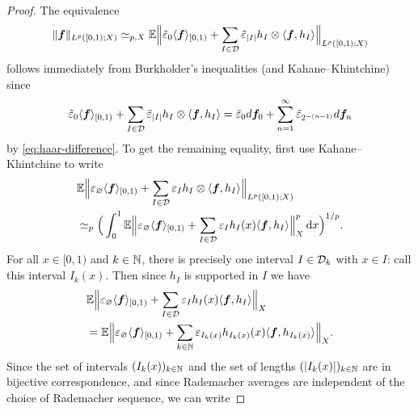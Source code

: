 \begin{proof}
  The equivalence
    \begin{equation*}
    \|\bm{f}\|_{L^p([0,1);X)}
    \simeq_{p,X} \mathbb{E} \Big\|  \tilde{\varepsilon}_{0} \langle \bm{f} \rangle_{[0,1)} + \sum_{I \in \mathcal{D}} \tilde{\varepsilon}_{|I|} h_{I} \otimes \langle \bm{f}, h_{I} \rangle \Big\|_{L^p([0,1);X)}
  \end{equation*}
  follows immediately from Burkholder's inequalities (and Kahane--Khintchine) since
  \begin{equation*}
     \tilde{\varepsilon}_{0} \langle \bm{f} \rangle_{[0,1)} + \sum_{I \in \mathcal{D}} \tilde{\varepsilon}_{|I|} h_{I} \otimes \langle \bm{f}, h_{I} \rangle
    = \tilde{\varepsilon}_{0} d\bm{f}_{0} + \sum_{n = 1}^{\infty} \tilde{\varepsilon}_{2^{-(n-1)}} d\bm{f}_{n}
  \end{equation*}
  by \eqref{eq:haar-difference}.
  To get the remaining equality, first use Kahane--Khintchine to write
  \begin{equation}\label{eq:haar-sqfn-kk}
    \begin{aligned}
      &\mathbb{E} \Big\| \varepsilon_{\varnothing} \langle \bm{f} \rangle_{[0,1)} + \sum_{I \in \mathcal{D}} \varepsilon_{I} h_{I} \otimes \langle \bm{f}, h_{I} \rangle \Big\|_{L^p([0,1);X)} \\
      &\simeq_{p} \Big( \int_{0}^{1} \mathbb{E} \Big\| \varepsilon_{\varnothing} \langle \bm{f} \rangle_{[0,1)} + \sum_{I \in \mathcal{D}} \varepsilon_{I} h_{I}(x) \langle \bm{f}, h_{I} \rangle \Big\|_{X}^{p} \, \mathrm{d} x\Big)^{1/p}.
  \end{aligned}
  \end{equation}
  For all $x \in [0,1)$ and $k \in \mathbb{N}$, there is precisely one interval $I \in \mathcal{D}_{k}$ with $x \in I$: call this interval $I_{k}(x)$.
  Then since $h_{I}$ is supported in $I$ we have
  \begin{equation*}
    \begin{aligned}
    &\mathbb{E} \Big\|  \varepsilon_{\varnothing} \langle \bm{f} \rangle_{[0,1)} + \sum_{I \in \mathcal{D}} \varepsilon_{I} h_{I}(x)  \langle \bm{f}, h_{I} \rangle \Big\|_{X} \\
    &= \mathbb{E} \Big\|  \varepsilon_{\varnothing} \langle \bm{f} \rangle_{[0,1)} + \sum_{k \in \mathbb{N}} \varepsilon_{I_{k}(x)} h_{I_{k}(x)}(x)  \langle \bm{f}, h_{I_{k}(x)} \rangle \Big\|_{X}.
  \end{aligned}
  \end{equation*}
  Since the set of intervals $(I_{k}(x))_{k \in \mathbb{N}}$ and the set of lengths $(|I_{k}(x)|)_{k \in \mathbb{N}}$ are in bijective correspondence, and since Rademacher averages are independent of the choice of Rademacher sequence, we can write

\end{proof}
